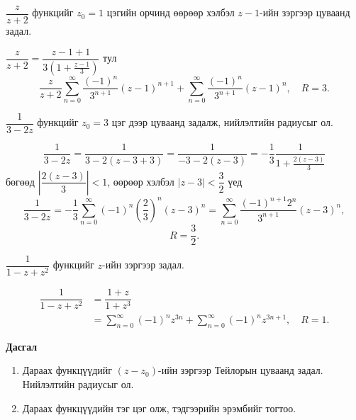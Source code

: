 \begin{exm}
$\dfrac{z}{z+2}$ функцийг $z_0=1$ цэгийн орчинд өөрөөр хэлбэл $z-1$-ийн зэргээр цуваанд задал.
\end{exm}
\begin{sol}
$\dfrac{z}{z+2}=\dfrac{z-1+1}{3\left(1+\frac{z-1}{3}\right)}$ тул 
$$\frac{z}{z+2}\sum\limits _{n=0}^\infty \frac{(-1)^n}{3^{n+1}}(z-1)^{n+1} +\sum\limits_{n=0}^\infty \frac{(-1)^n}{3^{n+1}}(z-1)^n, \quad R=3.$$
\end{sol}
\begin{exm}
$\dfrac{1}{3-2z}$ функцийг $z_0=3$ цэг дээр цуваанд задалж, 
нийлэлтийн радиусыг ол.
\end{exm}
\begin{sol}
$$\frac{1}{3-2z}=\frac{1}{3-2(z-3+3)}=\frac{1}{-3-2(z-3)}=-\frac{1}{3}\frac{1}{1+\frac{2(z-3)}{3}}$$ бөгөөд 
$\left|\dfrac{2(z-3)}{3}\right| <1$, өөрөөр хэлбэл $|z-3|<\dfrac{3}{2}$ үед 
$$\frac{1}{3-2z}=-\frac{1}{3}\sum\limits_{n=0}^\infty (-1)^n\left(\frac{2}{3}\right)^n (z-3)^n=\sum\limits_{n=0}^\infty \frac{(-1)^{n+1}2^n}{3^{n+1}}(z-3)^n, $$
$$R=\frac{3}{2}.$$
\end{sol}
\begin{exm}
$\dfrac{1}{1-z+z^2}$ функцийг $z$-ийн зэргээр задал.
\end{exm}
\begin{sol}
\begin{align*}
  \dfrac{1}{1-z+z^2}&=\dfrac{1+z}{1+z^3} \\
  &=\sum\limits_{n=0}^\infty (-1)^n z^{3n}+\sum\limits_{n=0}^\infty (-1)^nz^{3n+1}, \quad R=1.  
\end{align*}
\end{sol}
\begin{center}
    \textbf{Дасгал}
\end{center}
\begin{enumerate}
    \item 
Дараах функцүүдийг $(z-z_0)$-ийн зэргээр Тейлорын цуваанд задал. Нийлэлтийн радиусыг ол.
\item Дараах функцүүдийн тэг цэг олж, тэдгээрийн эрэмбийг тогтоо.
\end{enumerate}
